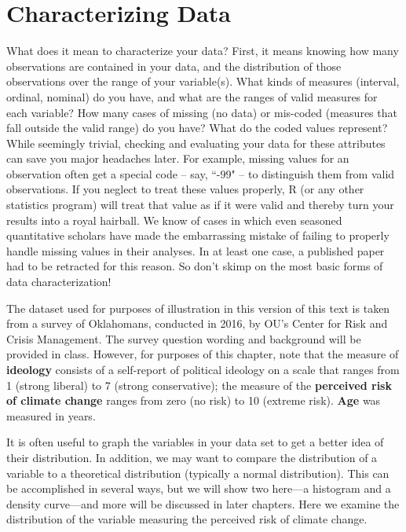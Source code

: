 \documentclass[11pt,openany]{book}\usepackage[]{graphicx}\usepackage[]{color}
\begin{document}
\section{Characterizing Data}

What does it mean to characterize your data? First, it means knowing how many observations are contained in your data, and the distribution of those observations over the range of your variable(s). What kinds of measures (interval, ordinal, nominal) do you have, and what are the ranges of valid measures for each variable? How many cases of missing (no data) or mis-coded (measures that fall outside the valid range) do you have? What do the coded values represent? While seemingly trivial, checking and evaluating your data for these attributes can save you major headaches later. For example, missing values for an observation often get a special code -- say, ``-99" -- to distinguish them  from valid observations. If you neglect to treat these values properly, R (or any other statistics program) will treat that value as if it were valid and thereby turn your results into a royal hairball. We know of cases in which even seasoned quantitative scholars have made the embarrassing mistake of failing to properly handle missing values in their analyses. In at least one case, a published paper had to be retracted for this reason. So don't skimp on the most basic forms of data characterization!

The dataset used for purposes of illustration in this version of this text is taken from a survey of Oklahomans, conducted in 2016, by OU's Center for Risk and Crisis Management. The survey question wording and background will be provided in class. However, for purposes of this chapter, note that the measure of  \textbf{ideology} consists of a self-report of political ideology on a scale that ranges from 1 (strong liberal) to 7 (strong conservative); the measure of the \textbf{perceived risk of climate change} ranges from zero (no risk) to 10 (extreme risk). \textbf{Age} was measured in years. 

It is often useful to graph the variables in your data set to get a better idea of their distribution. In addition, we may want to compare the distribution of a variable to a theoretical distribution (typically a normal distribution). This can be accomplished in several ways, but we will show two here---a histogram and a density curve---and more will be discussed in later chapters. Here we examine the distribution of the variable measuring the perceived risk of climate change. 
\end{document}
